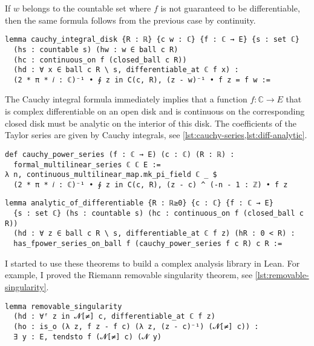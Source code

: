 \documentclass[a4paper, UKenglish,cleveref, autoref, thm-restate]{lipics-v2021}
\newcommand{\bbC}{\mathbb{C}}
\begin{document}
If \(w\) belongs to the countable set where \(f\) is not guaranteed to
be differentiable, then the same formula follows from the previous case by
continuity.

\begin{lstlisting}[caption=Cauchy integral formula for a circle,label=lst:cauchy-int]
lemma cauchy_integral_disk {R : ℝ} {c w : ℂ} {f : ℂ → E} {s : set ℂ}
  (hs : countable s) (hw : w ∈ ball c R)
  (hc : continuous_on f (closed_ball c R))
  (hd : ∀ x ∈ ball c R \ s, differentiable_at ℂ f x) :
  (2 * π * 𝑖 : ℂ)⁻¹ • ∮ z in C(c, R), (z - w)⁻¹ • f z = f w :=
\end{lstlisting}

The Cauchy integral formula immediately implies that a function
\(f\colon\bbC\to E\) that is complex differentiable on an open disk
and is continuous on the corresponding closed disk must be analytic on
the interior of this disk. The coefficients of the Taylor series are
given by Cauchy integrals, see \cref{lst:cauchy-series,lst:diff-analytic}.

\begin{lstlisting}[caption=Power series for a function differentiable on a disk,label=lst:cauchy-series]
def cauchy_power_series (f : ℂ → E) (c : ℂ) (R : ℝ) :
  formal_multilinear_series ℂ ℂ E :=
λ n, continuous_multilinear_map.mk_pi_field ℂ _ $
  (2 * π * 𝑖 : ℂ)⁻¹ • ∮ z in C(c, R), (z - c) ^ (-n - 1 : ℤ) • f z
\end{lstlisting}

\begin{lstlisting}[caption=Analyticity of a complex differentiable function,label=lst:diff-analytic]
lemma analytic_of_differentiable {R : ℝ≥0} {c : ℂ} {f : ℂ → E}
  {s : set ℂ} (hs : countable s) (hc : continuous_on f (closed_ball c R))
  (hd : ∀ z ∈ ball c R \ s, differentiable_at ℂ f z) (hR : 0 < R) :
  has_fpower_series_on_ball f (cauchy_power_series f c R) c R :=
\end{lstlisting}

I started to use these theorems to build a complex analysis library in
Lean. For example, I proved the Riemann removable singularity theorem,
see \autoref{lst:removable-singularity}.

\begin{lstlisting}[caption={Riemann removable singularity theorem},label=lst:removable-singularity]
lemma removable_singularity
  (hd : ∀ᶠ z in 𝓝[≠] c, differentiable_at ℂ f z)
  (ho : is_o (λ z, f z - f c) (λ z, (z - c)⁻¹) (𝓝[≠] c)) :
  ∃ y : E, tendsto f (𝓝[≠] c) (𝓝 y)
\end{lstlisting}
\end{document}
